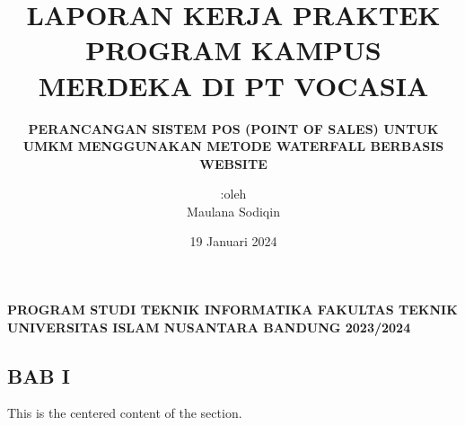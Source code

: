 \documentclass{article}
\date{19 Januari 2024}
\title{\textbf{LAPORAN KERJA PRAKTEK PROGRAM KAMPUS MERDEKA
		DI PT VOCASIA}}
\subtitle{\textbf{PERANCANGAN SISTEM POS (POINT OF SALES) UNTUK UMKM MENGGUNAKAN METODE WATERFALL BERBASIS WEBSITE}}
\author{:oleh \\ Maulana Sodiqin}
\begin{document}
\maketitle

\begin{center}
	\textbf{
		PROGRAM STUDI TEKNIK INFORMATIKA
		FAKULTAS TEKNIK
		UNIVERSITAS ISLAM NUSANTARA
		BANDUNG
		2023/2024
	}
\end{center}

\begin{center}
	\section*{\textbf{ BAB I}}
\end{center}


\begin{center}
	This is the centered content of the section.
\end{center}
\end{document}
